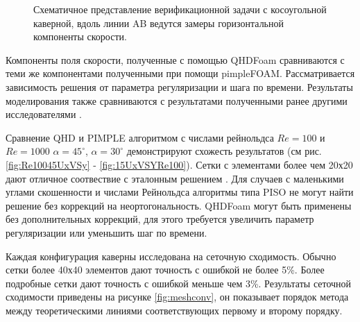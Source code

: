 \begin{figure}
    \centering
    \caption{Схематичное представление верификационной задачи с косоугольной каверной, вдоль линии AB ведутся замеры горизонтальной компоненты скорости.}
    \label{fig:skewedCavityScratch}
\end{figure}

Компоненты поля скорости, полученные с помощью QHDFoam сравниваются с теми же компонентами полученными при помощи pimpleFOAM. Рассматривается зависимость решения от параметра регуляризации и шага по времени. Результаты моделирования также сравниваются с результатами полученными ранее другими исследователями \cite{Hines2008,Erturk2007}. 

Сравнение QHD и PIMPLE алгоритмом с числами рейнольдса $Re=100$ и $Re=1000$ $\alpha = 45^{\circ}$, $\alpha = 30^{\circ}$ демонстрируют схожесть результатов (см рис. \ref{fig:Re10045UxVSy} - \ref{fig:15UxVSYRe100}). Сетки с элементами более чем 20х20 дают отличное соотвествие с эталонным решением \cite{Erturk2007}. Для случаев с маленькими углами скошенности и числами Рейнольдса алгоритмы типа PISO не могут найти решение без коррекций на неортогональность. QHDFoam могут быть применены без дополнительных коррекций, для этого требуется увеличить параметр регуляризации или уменьшить шаг по времени.

Каждая конфигурация каверны исследована на сеточную сходимость. Обычно сетки более 40х40 элементов дают точность с ошибкой не более 5\%. Более подробные сетки дают точность с ошибкой меньше чем 3\%. Результаты сеточной сходимости приведены на рисунке \ref{fig:meshconv}, он показывает порядок метода между теоретическими линиями соответствующих первому и второму порядку.

